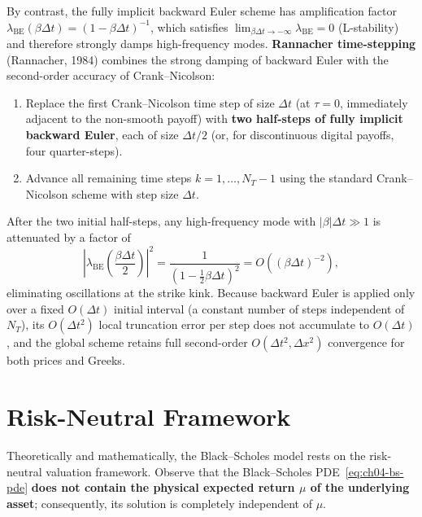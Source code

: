 By contrast, the fully implicit backward Euler scheme has amplification factor $\lambda_{\mathrm{BE}}(\beta\Delta t) = (1 - \beta\Delta t)^{-1}$, which satisfies $\lim_{\beta\Delta t \to -\infty} \lambda_{\mathrm{BE}} = 0$ (L-stability) and therefore strongly damps high-frequency modes. \textbf{Rannacher time-stepping} (Rannacher, 1984) combines the strong damping of backward Euler with the second-order accuracy of Crank--Nicolson:
\begin{enumerate}
    \item Replace the first Crank--Nicolson time step of size $\Delta t$ (at $\tau = 0$, immediately adjacent to the non-smooth payoff) with \textbf{two half-steps of fully implicit backward Euler}, each of size $\Delta t / 2$ (or, for discontinuous digital payoffs, four quarter-steps).
    \item Advance all remaining time steps $k = 1, \dots, N_T - 1$ using the standard Crank--Nicolson scheme with step size $\Delta t$.
\end{enumerate}
After the two initial half-steps, any high-frequency mode with $|\beta|\Delta t \gg 1$ is attenuated by a factor of
\[
    \left|\lambda_{\mathrm{BE}}\!\left(\frac{\beta\Delta t}{2}\right)\right|^2
    = \frac{1}{\left(1 - \frac{1}{2}\beta\Delta t\right)^2}
    = O\!\left((\beta\Delta t)^{-2}\right),
\]
eliminating oscillations at the strike kink. Because backward Euler is applied only over a fixed $O(\Delta t)$ initial interval (a constant number of steps independent of $N_T$), its $O(\Delta t^2)$ local truncation error per step does not accumulate to $O(\Delta t)$, and the global scheme retains full second-order $O(\Delta t^2, \Delta x^2)$ convergence for both prices and Greeks.

\section{Risk-Neutral Framework}
\label{sec:ch04-risk-neutral}

Theoretically and mathematically, the Black--Scholes model rests on the risk-neutral valuation framework. Observe that the Black--Scholes PDE~\eqref{eq:ch04-bs-pde} \textbf{does not contain the physical expected return $\mu$ of the underlying asset}; consequently, its solution is completely independent of $\mu$.

